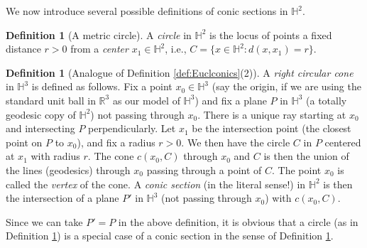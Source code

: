 \documentclass[12pt]{amsart}
\theoremstyle{definition}
\newtheorem{definition}[theorem]{Definition}
\begin{document}
We now introduce several possible definitions of conic sections in
${\mathbb H}^2$.
\begin{definition}[A metric circle]
\label{def:circ}
A \emph{circle} in ${\mathbb H}^2$ is the locus of points a fixed distance
$r>0$ from a \emph{center} $x_1\in {\mathbb H}^2$, i.e., 
$C=\{x\in {\mathbb H}^2: d(x,x_1)=r\}$. 
\end{definition}
\begin{definition}[{Analogue of Definition \ref{def:Euclconics}(2)}]
\label{def:hypconicinH3}
A \emph{right circular cone} in ${\mathbb H}^3$ is defined as follows.  Fix a point
$x_0\in {\mathbb H}^3$ (say the origin, if we are using the standard unit ball in
${\mathbb R}^3$ as our model of ${\mathbb H}^3$) and fix a plane $P$ in ${\mathbb H}^3$
(a totally geodesic copy of ${\mathbb H}^2$) not passing through $x_0$.  
There is a unique ray starting at $x_0$ and intersecting $P$
perpendicularly. Let $x_1$ be the intersection point (the closest
point on $P$ to $x_0$), and fix a radius $r>0$. We then have the circle
$C$ in $P$ centered at $x_1$ with radius $r$.  The cone $c(x_0, C)$
through $x_0$ and $C$ is then the union of
the lines (geodesics) through $x_0$ passing through a point of $C$.
The point $x_0$ is called the \emph{vertex} of the cone.
A \emph{conic section} (in the literal sense!)
in ${\mathbb H}^2$ is then the intersection of a plane $P'$ in ${\mathbb H}^3$ (not
passing through $x_0$) with $c(x_0, C)$.
\end{definition}
Since we can take $P'=P$ in the above definition, it is obvious that a
circle (as in Definition \ref{def:circ}) is a special case of a conic
section in the sense of Definition \ref{def:hypconicinH3}.
\end{document}
